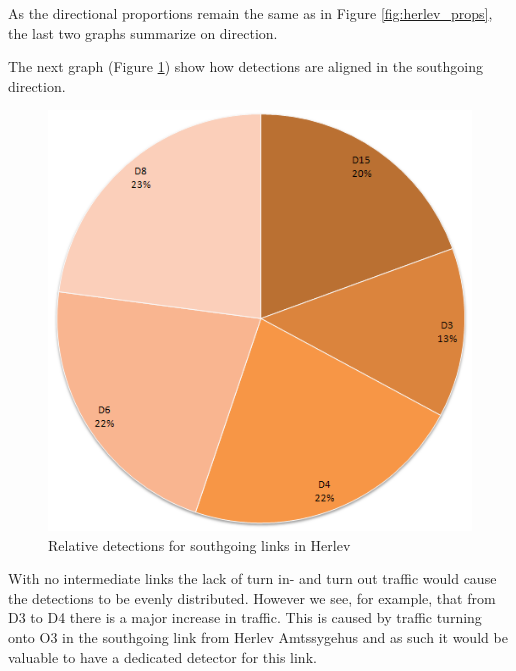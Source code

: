 As the directional proportions remain the same as in Figure \ref{fig:herlev_props}, the last two graphs summarize on direction.

The next graph (Figure \ref{fig:herlev_southgoing}) show how detections are aligned in the southgoing direction. 

\begin{figure}[!ht]
\begin{center}
\includegraphics[scale=0.4]{herlev_southgoing_detectors.png} 
\end{center}
\caption{Relative detections for southgoing links in Herlev}
\label{fig:herlev_southgoing}
\end{figure}

With no intermediate links the lack of turn in- and turn out traffic would cause the detections to be evenly distributed. However we see, for example, that from D3 to D4 there is a major increase in traffic. This is caused by traffic turning onto O3 in the southgoing link from Herlev Amtssygehus and as such it would be valuable to have a dedicated detector for this link.

